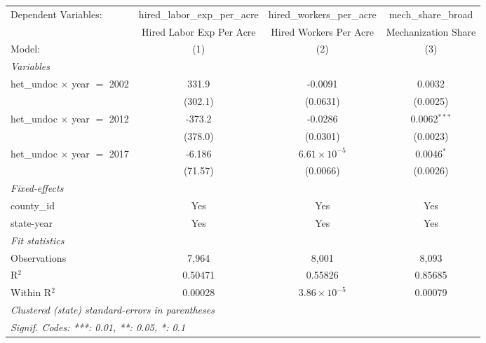 
\begingroup
\centering
\begin{tabular}{lccc}
   \tabularnewline \midrule \midrule
   Dependent Variables:                & hired\_labor\_exp\_per\_acre     & hired\_workers\_per\_acre    & mech\_share\_broad\\    
                                       & Hired Labor Exp Per Acre         & Hired Workers Per Acre       & Mechanization Share \\   
   Model:                              & (1)                              & (2)                          & (3)\\  
   \midrule
   \emph{Variables}\\
   het\_undoc $\times$ year $=$ 2002   & 331.9                            & -0.0091                      & 0.0032\\   
                                       & (302.1)                          & (0.0631)                     & (0.0025)\\   
   het\_undoc $\times$ year $=$ 2012   & -373.2                           & -0.0286                      & 0.0062$^{***}$\\   
                                       & (378.0)                          & (0.0301)                     & (0.0023)\\   
   het\_undoc $\times$ year $=$ 2017   & -6.186                           & $6.61\times 10^{-5}$         & 0.0046$^{*}$\\   
                                       & (71.57)                          & (0.0066)                     & (0.0026)\\   
   \midrule
   \emph{Fixed-effects}\\
   county\_id                          & Yes                              & Yes                          & Yes\\  
   state-year                          & Yes                              & Yes                          & Yes\\  
   \midrule
   \emph{Fit statistics}\\
   Observations                        & 7,964                            & 8,001                        & 8,093\\  
   R$^2$                               & 0.50471                          & 0.55826                      & 0.85685\\  
   Within R$^2$                        & 0.00028                          & $3.86\times 10^{-5}$         & 0.00079\\  
   \midrule \midrule
   \multicolumn{4}{l}{\emph{Clustered (state) standard-errors in parentheses}}\\
   \multicolumn{4}{l}{\emph{Signif. Codes: ***: 0.01, **: 0.05, *: 0.1}}\\
\end{tabular}
\par\endgroup


